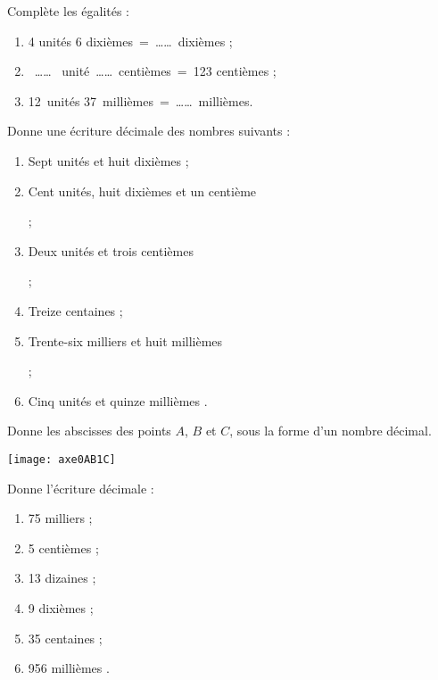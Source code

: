 \begin{exercice}
Complète les égalités :
\begin{enumerate}
 \item 4 unités 6 dixièmes = \ldots \ldots dixièmes ;
 \item  \ldots \ldots  unité \ldots \ldots centièmes = 123 centièmes ;
 \item 12 unités 37 millièmes = \ldots \ldots millièmes.
 \end{enumerate}
\end{exercice}


\begin{exercice}
Donne une écriture décimale des nombres suivants :
\begin{enumerate}
 \item Sept unités et huit dixièmes \dotfill ;
 \item Cent unités, huit dixièmes et un centième
 
 \dotfill ;
 \item Deux unités et trois centièmes
 
 \dotfill ;
 \item Treize centaines \dotfill ;
 \item Trente-six milliers et huit millièmes
 
 \dotfill ;
 \item Cinq unités et quinze millièmes \dotfill.
 \end{enumerate}
\end{exercice}


\begin{exercice}
Donne les abscisses des points $A$, $B$ et $C$, sous la forme d'un nombre décimal.
\begin{center} \texttt{[image: axe0AB1C]} \end{center}
\end{exercice}

\begin{exercice}
Donne l'écriture décimale :
\begin{enumerate} 
 \item 75 milliers \dotfill ; \hspace*{11em}

 \item 5 centièmes \dotfill ; \hspace*{11em}

 \item 13 dizaines \dotfill ; \hspace*{11em}

 \item 9 dixièmes \dotfill ; \hspace*{11em}

 \item 35 centaines \dotfill ;\hspace*{11em}

 \item 956 millièmes \dotfill. \hspace*{11em}

 \end{enumerate}
\end{exercice}



